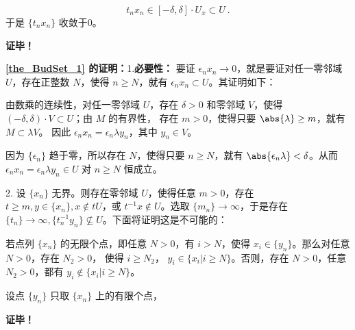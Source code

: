 \begin{equation}
t_nx_n\in[-\delta,\delta]\cdot U_x\subset U~.
\end{equation}
于是 $\{t_nx_n\}$ 收敛于0。

\textbf{证毕！}

\textbf{\autoref{the_BudSet_1} 的证明：}1.\textbf{必要性：} 要证 $\epsilon_n x_n\rightarrow0$，就是要证对任一零邻域 $U$，存在正整数 $N$，使得 $n\geq N$，就有 $\epsilon_n x_n\subset U$。其证明如下：

由数乘的连续性，对任一零邻域 $U$，存在 $\delta>0$ 和零邻域 $V$，使得 $(-\delta,\delta)\cdot V\subset U$；由 $M$ 的有界性， 存在 $m>0$，使得只要 $\abs{\lambda}\geq m$，就有 $M\subset\lambda V$。 因此 $\epsilon_nx_n=\epsilon_n \lambda y_n$，其中 $y_n\in V$。

因为 $\{\epsilon_n\}$ 趋于零，所以存在 $N$，使得只要 $n\geq N$，就有 $\abs{\epsilon_n\lambda}<\delta$。从而 $\epsilon_nx_n=\epsilon_n \lambda y_n\in U$ 对 $n\geq N$ 恒成立。


2. 设 $\{x_n\}$ 无界。则存在零邻域 $U$，使得任意 $m>0$，存在 $t\geq m,y\in\{x_n\},x\notin tU$，或 $t^{-1}x\notin U$。选取 $\{m_n\}\rightarrow\infty$，于是存在 $\{t_n\}\rightarrow\infty,\{t_n^{-1}y_n\}\nsubseteq U$。下面将证明这是不可能的：

若点列 $\{x_n\}$ 的无限个点，即任意 $N>0$，有 $i>N$，使得 $x_i\in\{y_n\}$。那么对任意 $N>0$，存在 $N_2>0$， 使得 $i\geq N_2$， $y_i\in \{x_i|i\geq N\}$。否则，存在 $N>0$，任意 $N_2>0$，都有 $y_i\notin\{x_i|i\geq N\}$。

 设点 $\{y_n\}$ 只取 $\{x_n\}$ 上的有限个点，


\textbf{证毕！}











